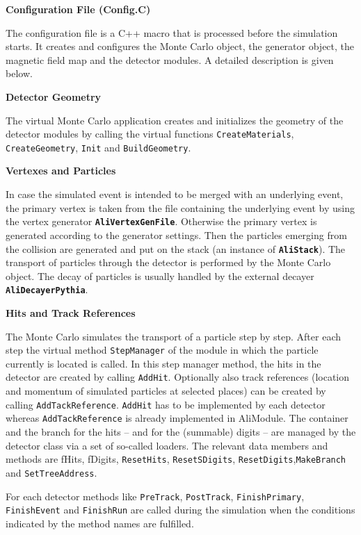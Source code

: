 \documentclass[12pt,a4paper,twoside]{article}
\newcommand{\class}[1]{\texttt{\textbf{#1}}\xspace}
\newcommand{\method}[1]{\texttt{#1}\xspace}
\begin{document}
\noindent
\textbf{Configuration File (Config.C)}

The configuration file is a C++ macro that is processed before the
simulation starts. It creates and configures the Monte Carlo object,
the generator object, the magnetic field map and the detector modules.
A detailed description is given below.

\noindent
\textbf{Detector Geometry}

The virtual Monte Carlo application creates and initializes the
geometry of the detector modules by calling the virtual functions
\method{CreateMaterials}, \method{CreateGeometry}, \method{Init} and
\method{BuildGeometry}.

\noindent
\textbf{Vertexes and Particles}

In case the simulated event is intended to be merged with an
underlying event, the primary vertex is taken from the file containing
the underlying event by using the vertex generator
\class{AliVertexGenFile}. Otherwise the primary vertex is generated
according to the generator settings. Then the particles emerging from
the collision are generated and put on the stack (an instance of
\class{AliStack}). The transport of particles through the detector is
performed by the Monte Carlo object. The decay of particles is usually
handled by the external decayer \class{AliDecayerPythia}.

\noindent
\textbf{Hits and Track References}

The Monte Carlo simulates the transport of a particle step by step.
After each step the virtual method \method{StepManager} of the module
in which the particle currently is located is called. In this step
manager method, the hits in the detector are created by calling
\method{AddHit}. Optionally also track references (location and
momentum of simulated particles at selected places) can be created by
calling \method{AddTackReference}. \method{AddHit} has to be
implemented by each detector whereas \method{AddTackReference} is
already implemented in AliModule. The container and the branch for the
hits -- and for the (summable) digits -- are managed by the detector
class via a set of so-called loaders. The relevant data members and
methods are fHits, fDigits, \method{ResetHits}, \method{ResetSDigits},
\method{ResetDigits},\method{MakeBranch} and \method{SetTreeAddress}.

For each detector methods like \method{PreTrack}, \method{PostTrack},
\method{FinishPrimary}, \method{FinishEvent} and \method{FinishRun}
are called during the simulation when the conditions indicated by the
method names are fulfilled.
\end{document}
